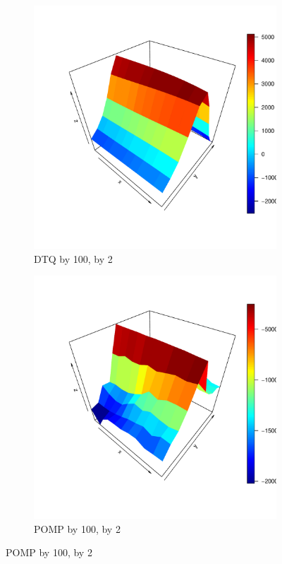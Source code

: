 \documentclass[a4paper,11pt]{article}
\begin{document}
\newpage

\begin{figure}[H]
\begin{subfigure}{0.48\textwidth}
\includegraphics[width=\linewidth]{dtq_by10_by2.pdf}
\caption{DTQ by 100, by 2} \label{fig:a}
\end{subfigure}\hspace*{\fill}
\begin{subfigure}{0.48\textwidth}
\includegraphics[width=\linewidth]{pomp_by10_by2.pdf}
\caption{POMP by 100, by 2} \label{fig:b}
\end{subfigure}


\end{figure}
\end{document}
